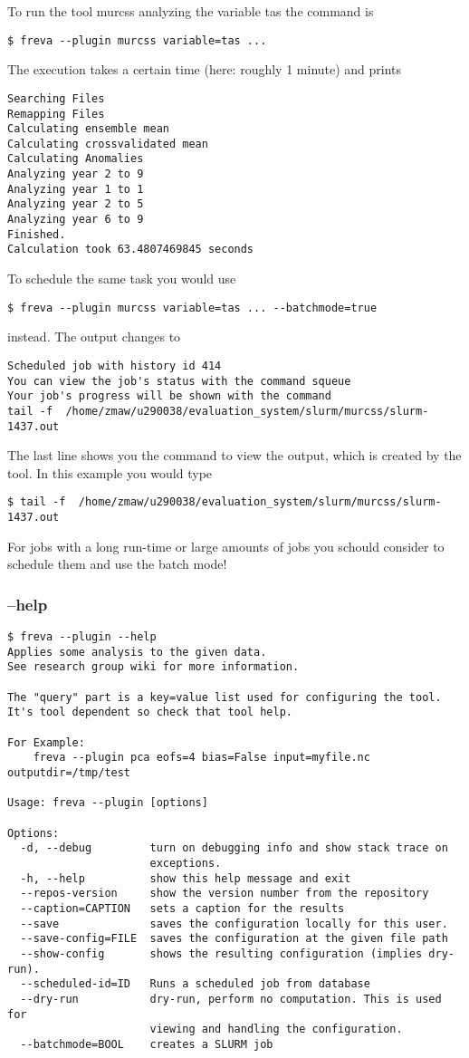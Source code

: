 \documentclass[a4paper,11pt]{ltxdoc}
\begin{document}
To run the tool murcss analyzing the variable tas the command is
\begin{verbatim}
$ freva --plugin murcss variable=tas ...
\end{verbatim}

The execution takes a certain time (here: roughly 1 minute) and prints
\begin{verbatim}
Searching Files
Remapping Files
Calculating ensemble mean
Calculating crossvalidated mean
Calculating Anomalies
Analyzing year 2 to 9
Analyzing year 1 to 1
Analyzing year 2 to 5
Analyzing year 6 to 9
Finished.
Calculation took 63.4807469845 seconds
\end{verbatim}
To schedule the same task you would use
\begin{verbatim}
$ freva --plugin murcss variable=tas ... --batchmode=true 
\end{verbatim}

instead. The output changes to
\begin{verbatim}
Scheduled job with history id 414
You can view the job's status with the command squeue
Your job's progress will be shown with the command
tail -f  /home/zmaw/u290038/evaluation_system/slurm/murcss/slurm-1437.out
\end{verbatim}
The last line shows you the command to view the output, which is created by the tool.
In this example you would type
\begin{verbatim}
$ tail -f  /home/zmaw/u290038/evaluation_system/slurm/murcss/slurm-1437.out
\end{verbatim}
For jobs with a long run-time or large amounts of jobs you schould consider
to schedule them and use the batch mode!

\subsubsection*{--help}
\begin{verbatim}
$ freva --plugin --help
Applies some analysis to the given data.
See research group wiki for more information.

The "query" part is a key=value list used for configuring the tool. 
It's tool dependent so check that tool help.

For Example:
    freva --plugin pca eofs=4 bias=False input=myfile.nc outputdir=/tmp/test

Usage: freva --plugin [options]

Options:
  -d, --debug         turn on debugging info and show stack trace on
                      exceptions.
  -h, --help          show this help message and exit
  --repos-version     show the version number from the repository
  --caption=CAPTION   sets a caption for the results
  --save              saves the configuration locally for this user.
  --save-config=FILE  saves the configuration at the given file path
  --show-config       shows the resulting configuration (implies dry-run).
  --scheduled-id=ID   Runs a scheduled job from database
  --dry-run           dry-run, perform no computation. This is used for
                      viewing and handling the configuration.
  --batchmode=BOOL    creates a SLURM job
\end{verbatim}
\end{document}
